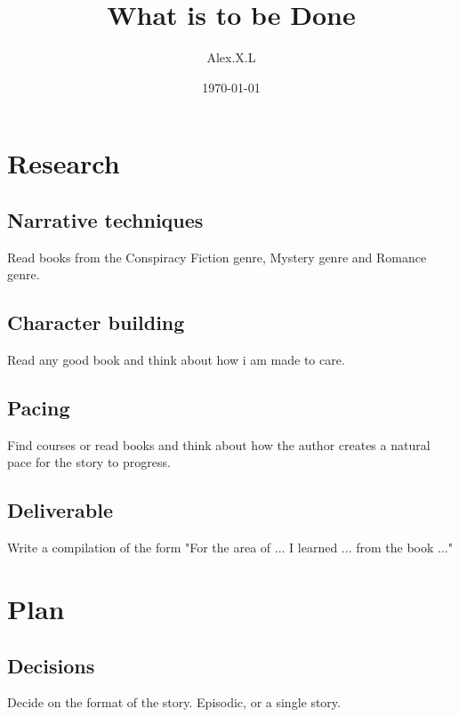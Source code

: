 \documentclass[11pt]{article}
\begin{document}
\begin{titlepage}
\title{What is to be Done}
\author{Alex.X.L}
\date{\today} %
\maketitle
\thispagestyle{empty} %
\end{titlepage}



\tableofcontents
\newpage %






\section{Research}

	\subsection{Narrative techniques}
	Read books from the Conspiracy Fiction genre, Mystery genre and Romance genre. 
	\subsection{Character building}
	Read any good book and think about how i am made to care.
	\subsection{Pacing}
	Find courses or read books and think about how the author creates a natural pace for the story to progress.
	\subsection{Deliverable}
	Write a compilation of the form "For the area of ... I learned ... from the book ..."
	
\section{Plan}
	\subsection{Decisions}
		Decide on the format of the story. Episodic, or a single story.
		
\end{document}
